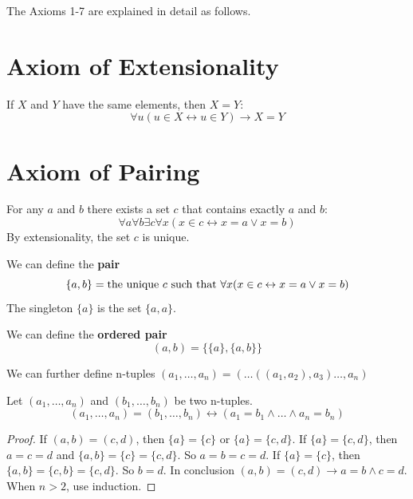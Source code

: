 \documentclass[12pt]{book}
\begin{document}
The Axioms 1-7 are explained in detail as follows.
\section{Axiom of Extensionality}
\begin{axiom}
	If $X$ and $Y$ have the same elements, then $X=Y$:
	\begin{equation}
		\forall u(u\in X\leftrightarrow u\in Y)\rightarrow X=Y
	\end{equation}
\end{axiom}
\section{Axiom of Pairing}
\begin{axiom}
	For any $a$ and $b$ there exists a set $c$ that contains exactly $a$ and $b$:
	\begin{equation}
		\forall a\forall b\exists c\forall x(x\in c\leftrightarrow x=a\vee x=b)
	\end{equation}
	By extensionality, the set $c$ is unique.
\end{axiom}
\begin{definition}
	We can define the {\bf pair} 
	\begin{equation}
		\{a,b\}={\rm the\ unique\ }c{\rm\ such\ that\ } \forall x(x\in c\leftrightarrow x=a\vee x=b)
	\end{equation}
	The singleton $\{a\}$ is the set $\{a,a\}$.
\end{definition}
\begin{definition}[Kuratowski]
	We can define the {\bf ordered pair} 
	\begin{equation}
		(a,b)=\{\{a\},\{a,b\}\}
	\end{equation}
	
	We can further define n-tuples $(a_1,\dots, a_n)=(\dots((a_1,a_2),a_3)\dots,a_n)$
\end{definition}
\begin{theorem}
	Let $(a_1,\dots, a_n)$ and $(b_1,\dots, b_n)$ be two n-tuples.
	\begin{equation}
		(a_1,\dots, a_n)=(b_1,\dots, b_n)\leftrightarrow (a_1=b_1\wedge\dots\wedge a_n=b_n)
	\end{equation}
\end{theorem}
\begin{proof}
	If $(a,b)=(c,d)$, then $\{a\}=\{c\}$ or $\{a\}=\{c,d\}$. If $\{a\}=\{c,d\}$, then $a=c=d$ and $\{a,b\}=\{c\}=\{c,d\}$. So $a=b=c=d$. If $\{a\}=\{c\}$, then $\{a,b\}=\{c,b\}=\{c,d\}$. So $b=d$. In conclusion $(a,b)=(c,d)\rightarrow a=b\wedge c=d$. When $n>2$, use induction.
\end{proof}
\end{document}
